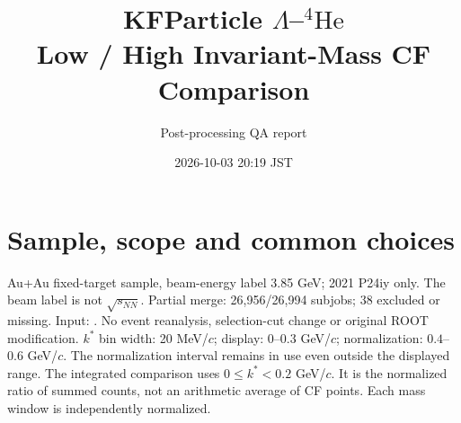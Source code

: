 \documentclass[10pt,a4paper]{article}
\title{KFParticle $\Lambda$--$^{4}\mathrm{He}$\\Low / High Invariant-Mass CF Comparison}
\author{Post-processing QA report}
\date{2026-10-03 20:19 JST}
\begin{document}
\maketitle
\section{Sample, scope and common choices}
Au+Au fixed-target sample, beam-energy label 3.85 GeV; 2021 P24iy only. The beam label is not $\sqrt{s_{NN}}$. Partial merge: 26,956/26,994 subjobs; 38 excluded or missing.
Input: {\small{}}. No event reanalysis, selection-cut change or original ROOT modification.
$k^*$ bin width: 20 MeV/$c$; display: $0$--$0.3$ GeV/$c$; normalization: $0.4$--$0.6$ GeV/$c$. The normalization interval remains in use even outside the displayed range.
The integrated comparison uses $0\leq k^*<0.2$ GeV/$c$. It is the normalized ratio of summed counts, not an arithmetic average of CF points. Each mass window is independently normalized.
\end{document}
